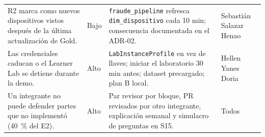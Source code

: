 \documentclass[12pt,letterpaper]{article}
\newcommand{\code}[1]{{\small\texttt{#1}}}
\begin{document}
\begin{footnotesize}
\begin{longtable}{@{}P{1.95in}P{0.5in}P{2.85in}P{1.05in}@{}}
R2 marca como nuevos dispositivos vistos después de la última actualización de Gold. & Bajo & \code{fraude\_pipeline} refresca \code{dim\_dispositivo} cada 10 min; consecuencia documentada en el ADR-02. & Sebastián Salazar Henao\\[1pt]
Las credenciales caducan o el Learner Lab se detiene durante la demo. & Alto & \code{LabInstanceProfile} en vez de llaves; iniciar el laboratorio 30 min antes; dataset precargado; plan B local. & Hellen Yanes Doria\\[1pt]
Un integrante no puede defender partes que no implementó (40~\% del E2). & Alto & Par revisor por bloque, PR revisados por otro integrante, explicación semanal y simulacro de preguntas en S15. & Todos\\
\end{longtable}
\end{footnotesize}

\clearpage
\end{document}
